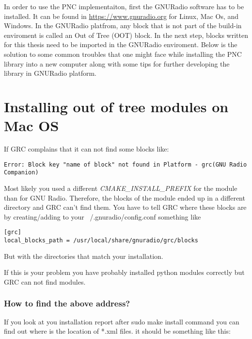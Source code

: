 \label{chapter:appendix}

In order to use the PNC implementaiton, first the GNURadio software has to be installed. It can be found in \url{https://www.gnuradio.org} for Linux, Mac Os, and Windows. In the GNURadio platfrom, any block that is not part of the build-in enviroment is called an Out of Tree (OOT) block. In the next step, blocks written for this thesis need to be imported in the GNURadio enviroment. Below is the solution to some common troubles that one might face while installing the PNC library into a new computer along with some tips for further developing the library in GNURadio platform.

\section{Installing out of tree modules on Mac OS}

If GRC complains that it can not find some blocks like:
\begin{footnotesize}
\begin{lstlisting}
Error: Block key "name of block" not found in Platform - grc(GNU Radio Companion)
\end{lstlisting}
\end{footnotesize}
Most likely you used a different \textit{CMAKE\_INSTALL\_PREFIX} for the module than for GNU Radio. Therefore, the blocks of the module ended up in a different directory and GRC can't find them. You have to tell GRC where these blocks are by creating/adding to your ~/.gnuradio/config.conf something like

\begin{footnotesize}
\begin{lstlisting}
[grc]
local_blocks_path = /usr/local/share/gnuradio/grc/blocks
\end{lstlisting}
\end{footnotesize}
But with the directories that match your installation.

If this is your problem you have probably installed python modules correctly but GRC can not find modules.

\subsubsection{How to find the above address?}
If you look at you installation report after sudo make install command you can find out where is the location of *.xml files. it should be something like this:

